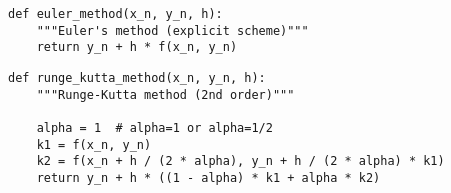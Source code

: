 \begin{lstlisting}[caption=Метод Эйлера]
def euler_method(x_n, y_n, h):
	"""Euler's method (explicit scheme)"""
	return y_n + h * f(x_n, y_n)
\end{lstlisting}

\begin{lstlisting}[caption=Методы Рунге-Кутта второго порядка]
def runge_kutta_method(x_n, y_n, h):
	"""Runge-Kutta method (2nd order)"""

	alpha = 1  # alpha=1 or alpha=1/2
	k1 = f(x_n, y_n)
	k2 = f(x_n + h / (2 * alpha), y_n + h / (2 * alpha) * k1)
	return y_n + h * ((1 - alpha) * k1 + alpha * k2)
\end{lstlisting}



